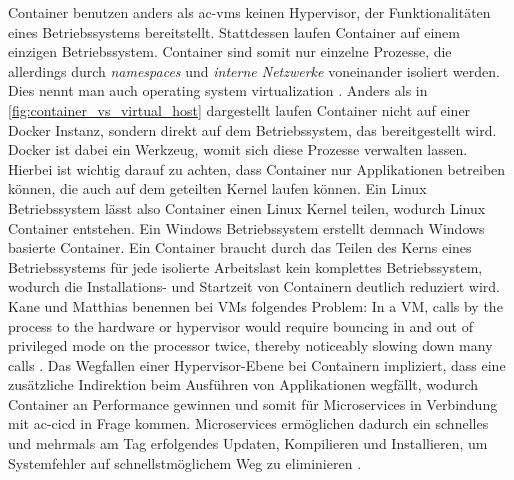 Container benutzen anders als \acrshort{ac-vm}s keinen Hypervisor, der Funktionalitäten eines Betriebssystems bereitstellt. Stattdessen laufen Container auf einem einzigen Betriebssystem. Container sind somit nur einzelne Prozesse, die allerdings durch \emph{namespaces} und \emph{interne Netzwerke} voneinander isoliert werden. Dies nennt man auch \glqq operating system virtualization \grqq{} \parencite{kane2018docker}. Anders als in \autoref{fig:container_vs_virtual_host} dargestellt laufen Container nicht auf einer Docker Instanz, sondern direkt auf dem Betriebssystem, das bereitgestellt wird. Docker ist dabei ein Werkzeug, womit sich diese Prozesse verwalten lassen. Hierbei ist wichtig darauf zu achten, dass Container nur Applikationen betreiben können, die auch auf dem geteilten Kernel laufen können. Ein Linux Betriebssystem lässt also Container einen Linux Kernel teilen, wodurch Linux Container entstehen. Ein Windows Betriebssystem erstellt demnach Windows basierte Container. Ein Container braucht durch das Teilen des Kerns eines Betriebssystems für jede isolierte Arbeitslast kein komplettes Betriebssystem, wodurch die Installations- und Startzeit von Containern deutlich reduziert wird. Kane und Matthias benennen bei VMs folgendes Problem: \glqq In a VM, calls by the process to the hardware or hypervisor would require bouncing in and out of privileged mode on the processor twice, thereby noticeably slowing down many calls\grqq{} \parencite{kane2018docker}. Das Wegfallen einer Hypervisor-Ebene bei Containern impliziert, dass eine zusätzliche Indirektion beim Ausführen von Applikationen wegfällt, wodurch Container an Performance gewinnen und somit für Microservices in Verbindung mit \gls{ac-cicd} in Frage kommen. Microservices ermöglichen dadurch ein schnelles und mehrmals am Tag erfolgendes Updaten, Kompilieren und Installieren, um Systemfehler auf schnellstmöglichem Weg zu eliminieren \parencites{kane2018docker}{chelladhurai2017learning}.

